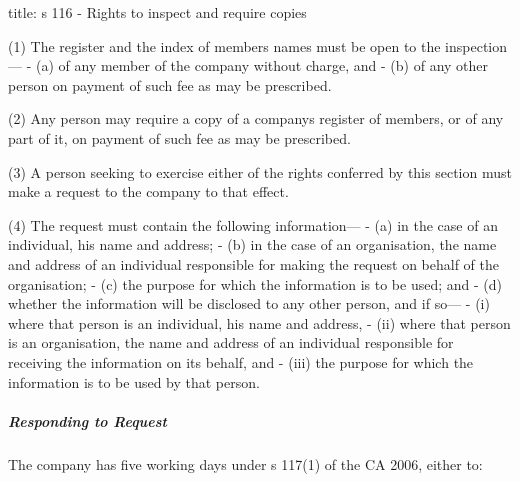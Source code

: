 \documentclass[
]{article}
\newenvironment{Shaded}{}{}
\newcommand{\NormalTok}[1]{#1}
\begin{document}
\begin{Shaded}
\begin{Highlighting}[]
\NormalTok{title: s 116 {-} Rights to inspect and require copies}

\NormalTok{(1) The register and the index of members\textquotesingle{} names must be open to the inspection—}
\NormalTok{{-} (a) of any member of the company without charge, and}
\NormalTok{{-} (b) of any other person on payment of such fee as may be prescribed.}

\NormalTok{(2) Any person may require a copy of a company\textquotesingle{}s register of members, or of any part of it, on payment of such fee as may be prescribed.}

\NormalTok{(3) A person seeking to exercise either of the rights conferred by this section must make a request to the company to that effect.}

\NormalTok{(4) The request must contain the following information—}
\NormalTok{{-} (a) in the case of an individual, his name and address;}
\NormalTok{{-} (b) in the case of an organisation, the name and address of an individual responsible for making the request on behalf of the organisation;}
\NormalTok{{-} (c) the purpose for which the information is to be used; and}
\NormalTok{{-} (d) whether the information will be disclosed to any other person, and if so—}
\NormalTok{    {-} (i) where that person is an individual, his name and address,}
\NormalTok{    {-} (ii) where that person is an organisation, the name and address of an individual responsible for receiving the information on its behalf, and}
\NormalTok{    {-} (iii) the purpose for which the information is to be used by that person.}
\end{Highlighting}
\end{Shaded}

\hypertarget{responding-to-request}{%
\subparagraph{Responding to Request}\label{responding-to-request}}

The company has five working days under s 117(1) of the CA 2006, either
to:
\end{document}

